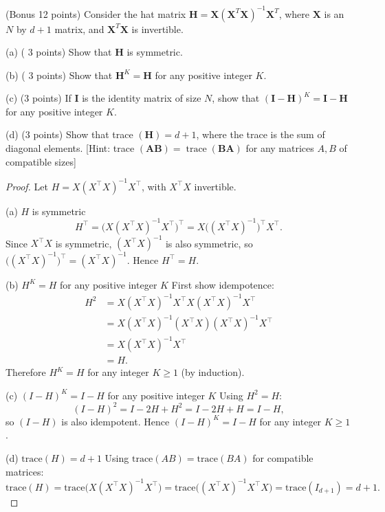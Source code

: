 \documentclass[en,hazy,blue,12pt,normal]{elegantnote}
\begin{document}
\newpage
\begin{homework}
    (Bonus 12 points) Consider the hat matrix $\mathbf{H}=\mathbf{X}\left(\mathbf{X}^T \mathbf{X}\right)^{-1} \mathbf{X}^T$, where $\mathbf{X}$ is an $N$ by $d+1$ matrix, and $\mathbf{X}^T \mathbf{X}$ is invertible.
    
(a) ( 3 points) Show that $\mathbf{H}$ is symmetric.

(b) ( 3 points) Show that $\mathbf{H}^K=\mathbf{H}$ for any positive integer $K$.

(c) (3 points) If $\mathbf{I}$ is the identity matrix of size $N$, show that $(\mathbf{I}-\mathbf{H})^K=\mathbf{I}-\mathbf{H}$ for any positive integer $K$.

(d) (3 points) Show that trace $(\mathbf{H})=d+1$, where the trace is the sum of diagonal elements. [Hint: trace $(\mathbf{A B})=\operatorname{trace}(\mathbf{B A})$ for any matrices $A, B$ of compatible sizes]
\end{homework}

\begin{proof}
    Let $H = X (X^\top X)^{-1}X^\top$, with $X^\top X$ invertible.

(a) $H$ is symmetric
\[
H^\top = \bigl(X (X^\top X)^{-1}X^\top\bigr)^\top = X\bigl((X^\top X)^{-1}\bigr)^\top X^\top.
\]
Since $X^\top X$ is symmetric, $(X^\top X)^{-1}$ is also symmetric, so $\bigl((X^\top X)^{-1}\bigr)^\top=(X^\top X)^{-1}$. Hence $H^\top=H$.

(b) $H^K = H$ for any positive integer $K$
First show idempotence:
\begin{align*}
H^2
&= X (X^\top X)^{-1}X^\top X (X^\top X)^{-1}X^\top \\
&= X (X^\top X)^{-1}(X^\top X)(X^\top X)^{-1}X^\top \\
&= X (X^\top X)^{-1}X^\top \\
&= H.
\end{align*}
Therefore $H^K=H$ for any integer $K\ge 1$ (by induction).

(c) $(I-H)^K = I-H$ for any positive integer $K$
Using $H^2=H$:
\[
(I-H)^2 = I - 2H + H^2 = I - 2H + H = I-H,
\]
so $(I-H)$ is also idempotent. Hence $(I-H)^K = I-H$ for any integer $K\ge 1$.

(d) $\mathrm{trace}(H)=d+1$
Using $\mathrm{trace}(AB)=\mathrm{trace}(BA)$ for compatible matrices:
\[
\mathrm{trace}(H) = \mathrm{trace}\bigl(X (X^\top X)^{-1}X^\top\bigr)
= \mathrm{trace}\bigl((X^\top X)^{-1}X^\top X\bigr)
= \mathrm{trace}(I_{d+1}) = d+1.
\]
\end{proof}
\end{document}

